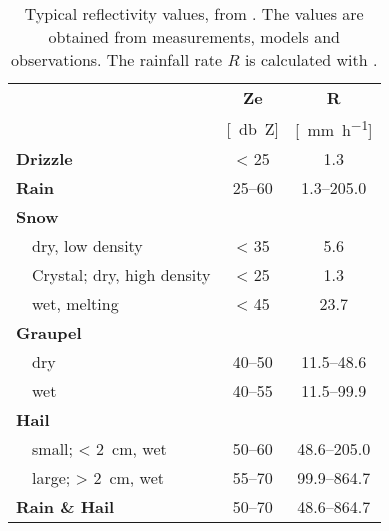 \begin{table}[t]
	\begin{center}
		\caption{Typical reflectivity values, from \cite{doviak_doppler_1993}. The values are obtained from measurements, models and observations. The rainfall rate $R$ is calculated with . }\label{tab:ref_values}
		\begin{tabular}{ll|c|c}
			\hline \hline
			\multicolumn{2}{l|}{} & \textbf{Ze} & \textbf{R} \\ 
			\multicolumn{2}{l|}{} & [\SI{}{\decibel Z}] & [\SI{}{\mm\per\hour}] \\ \hline \hline
			\multicolumn{2}{l|}{\textbf{Drizzle}} & \num{< 25} &  \num{1.3} \\ \hline
			\multicolumn{2}{l|}{\textbf{Rain}} & \numrange{25}{60} & \numrange{1.3}{205.0} \\ \hline
			\multicolumn{2}{l|}{\textbf{Snow}} &  \\ 
			& dry, low density 	& \num{< 35} & \num{5.6}\\ \hline
			& Crystal; dry, high density & \num{< 25} & \num{1.3}\\ \hline
			& wet, melting 		& \num{< 45} & \num{23.7} \\ \hline
			\multicolumn{2}{l|}{\textbf{Graupel}} & \\
			& dry 				& \numrange{40}{50} & \numrange{11.5}{48.6} \\ \hline
			& wet				& \numrange{40}{55} & \numrange{11.5}{99.9} \\ \hline
			\multicolumn{2}{l|}{\textbf{Hail}} & \\
			& small; \SI{< 2}{\cm}, wet & \numrange{50}{60} & \numrange{48.6}{205.0}\\
			& large; \SI{> 2}{\cm}, wet & \numrange{55}{70} & \numrange{99.9}{864.7}\\ \hline
			\multicolumn{2}{l|}{\textbf{Rain \& Hail}} & \numrange{50}{70} & \numrange{48.6}{864.7} \\ 
			\hline \hline
		\end{tabular}
	\end{center}
\end{table}